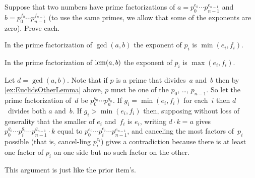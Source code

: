 \documentclass{ibl}  %
\begin{document}
\begin{ex}
Suppose that two numbers have prime factorizations 
of $a=p_0^{e_0}\cdots p_{n-1}^{e_{n-1}}$
and $b=p_0^{f_0}\cdots p_{n-1}^{f_{n-1}}$
(to use the same primes, we allow that some of the exponents are zero).
Prove each.
\begin{exes}
\item
  In the prime factorization of
  $\gcd(a,b)$ the exponent of $p_i$ is $\min(e_i,f_i)$.
\item In the prime factorization of $\operatorname{lcm}(a,b)$ the exponent of 
  $p_i$ is $\max(e_i,f_i)$.
\end{exes}
\begin{ans}
\begin{exes}
\item Let $d=\gcd(a,b)$.
  Note that if $p$ is a prime that divides~$a$ and~$b$ then
  by \ref{ex:EuclidsOtherLemma} above, $p$ must be one of the 
  $p_0$, \ldots, $p_{n-1}$.   
  So let the prime factorization of~$d$ be $p_0^{g_0}\cdots p_n^{g_n}$. 
  If $g_i=\min(e_i,f_i)$ for each~$i$ then $d$~divides both $a$ and~$b$.
  If $g_i>\min(e_i,f_i)$ then, supposing without loss of generality
  that the smaller of $e_i$ and~$f_i$ is $e_i$, writing
  $d\cdot k=a$ gives $p_0^{g_0}\cdots p_i^{g_i}\cdots p_{n-1}^{g_{n-1}}\cdot k$
  equal to $p_0^{e_0}\cdots p_i^{e_i}\cdots p_{n-1}^{e_{n-1}}$, and 
  canceling the most factors of~$p_i$ possible (that is, cancel-ling $p_i^{e_i}$)
  gives a contradiction because there is at least one factor
  of $p_i$ on one side but no such factor on the other.
\item  This argument is just like the prior item's.  
\end{exes}
\end{ans}
\end{ex}
\end{document}

